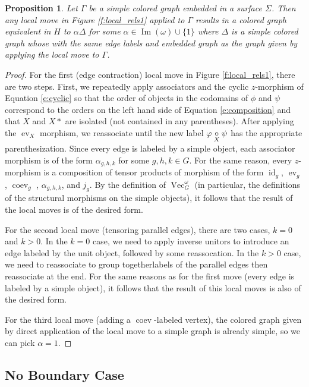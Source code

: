 \documentclass{amsart}
\newtheorem{prop}[thm]{Proposition}
\DeclareMathOperator{\id}{id}
\DeclareMathOperator{\Vect}{Vec}
\DeclareMathOperator{\Img}{Im}
\DeclareMathOperator{\coev}{coev}
\DeclareMathOperator{\ev}{ev}
\newcommand{\ph}{\varphi}
\begin{document}
\begin{prop} \label{prop:omega}
Let $\Gamma$ be a simple colored graph embedded in a surface $\Sigma$.  Then any local move in Figure \ref{f:local_rels1} applied to $\Gamma$ results in a colored graph equivalent in $H$ to $\alpha \Delta$ for some $\alpha \in \Img(\omega) \cup \{1\}$ where $\Delta$ is a simple colored graph whose with the same edge labels and embedded graph as the graph given by applying the local move to $\Gamma$.
\end{prop}
\begin{proof}
For the first (edge contraction) local move in Figure \ref{f:local_rels1}, there are two steps.  First, we repeatedly apply associators and the cyclic $z$-morphism of Equation \ref{e:cyclic} so that the order of objects in the codomains of $\phi$ and $\psi$ correspond to the orders on the left hand side of Equation \ref{e:composition} and that $X$ and $X*$ are isolated (not contained in any parentheses).  After applying the $\ev_X$ morphism, we reassociate until the new label $\ph\cc{X}\psi$ has the appropriate parenthesization.  Since every edge is labeled by a simple object, each associator morphism is  of the form $\alpha_{g,h,k}$ for some $g,h,k \in G$.  For the same reason, every $z$-morphism is a composition of tensor products of morphism of the form $\id_{g}$, $\ev_g$, $\coev_g$ , $\alpha_{g,h,k}$, and $j_g$.  By the definition of $\Vect_G^\omega$ (in particular, the definitions of the structural morphisms on the simple objects), it follows that the result of the local moves is of the desired form.

For the second local move (tensoring parallel edges), there are two cases, $k = 0$ and $k > 0$.  In the $k = 0$ case, we need to apply inverse unitors to introduce an edge labeled by the unit object, followed by some reassocation.  In the $k > 0$ case, we need to reassociate to group togetherlabels of the parallel edges then reassociate at the end.  For the same reasons as for the first move (every edge is labeled by a simple object), it follows that the result of this local moves is also of the desired form.

For the third local move (adding a $\coev$-labeled vertex), the colored graph given by direct application of the local move to a simple graph is already simple, so we can pick $\alpha = 1$.  
\end{proof}

\subsection{No Boundary Case}
\end{document}
